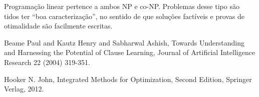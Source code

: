 \documentclass{article}
\begin{document}
Programação linear pertence a ambos NP e co-NP. Problemas desse tipo são tidos ter ``boa
caracterização'', no sentido de que soluções factíveis e provas de otimalidade são facilmente
escritas.

  \begin{thebibliography}{1}

    Beame Paul and Kautz Henry and Sabharwal Ashish,
    Towards Understanding and Harnessing the Potential of Clause Learning,
    Journal of Artificial Intelligence Research 22 (2004) 319-351.


    Hooker N. John, Integrated Methods for Optimization, Second Edition, Springer Verlag, 2012.

  \end{thebibliography}
\end{document}
